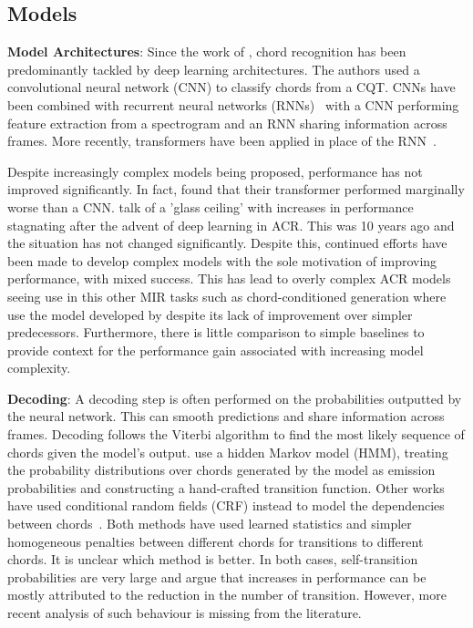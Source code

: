 \subsection{Models}

\textbf{Model Architectures}: Since the work of \citet{RethinkingChordRecognition}, chord recognition has been predominantly tackled by deep learning architectures. The authors used a convolutional neural network (CNN) to classify chords from a CQT. CNNs have been combined with recurrent neural networks (RNNs)~\citep{ACRCNNRNN1,ACRLargeVocab1,StructuredTraining} with a CNN performing feature extraction from a spectrogram and an RNN sharing information across frames. More recently, transformers have been applied in place of the RNN~\citep{MelodyTranscriptionViaGenerativePreTraining, HarmonyTransformer, AttendToChords,ChordFormer,CurriculumLearning,BTC}.

Despite increasingly complex models being proposed, performance has not improved significantly. In fact, \citet{BTC} found that their transformer performed marginally worse than a CNN. \citet{FourTimelyInsights} talk of a 'glass ceiling' with increases in performance stagnating after the advent of deep learning in ACR. This was 10 years ago and the situation has not changed significantly. Despite this, continued efforts have been made to develop complex models with the sole motivation of improving performance, with mixed success. This has lead to overly complex ACR models seeing use in this other MIR tasks such as chord-conditioned generation where \citet{MusiConGen} use the model developed by \citet{BTC} despite its lack of improvement over simpler predecessors. Furthermore, there is little comparison to simple baselines to provide context for the performance gain associated with increasing model complexity.

\textbf{Decoding}: A decoding step is often performed on the probabilities outputted by the neural network. This can smooth predictions and share information across frames. Decoding follows the Viterbi algorithm to find the most likely sequence of chords given the model's output. \citet{BalanceRandomForestACR} use a hidden Markov model (HMM), treating the probability distributions over chords generated by the model as emission probabilities and constructing a hand-crafted transition function.  Other works have used conditional random fields (CRF) instead to model the dependencies between chords~\citep{ACRLargeVocab1}. Both methods have used learned statistics and simpler homogeneous penalties between different chords for transitions to different chords. It is unclear which method is better. In both cases, self-transition probabilities are very large and \citet{CommonVariations} argue that increases in performance can be mostly attributed to the reduction in the number of transition. However, more recent analysis of such behaviour is missing from the literature.

